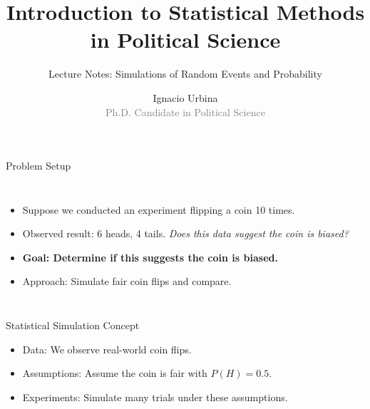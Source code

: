 \documentclass[]{beamer} %
\title{Introduction to Statistical Methods in Political Science}
\subtitle{Lecture Notes: Simulations of Random Events and Probability}
\author{Ignacio Urbina \texorpdfstring{\\ \vspace{0.3em}}{ } \scriptsize \textcolor{gray}{Ph.D. Candidate in Political Science}}
\date{}
\begin{document}
\begin{frame}
    \titlepage
\end{frame}

\begin{frame}{Problem Setup}
  \begin{columns}[T] %
      \begin{itemize}
        \item Suppose we conducted an experiment flipping a coin 10 times.
        \item Observed result: 6 heads, 4 tails. \emph{Does this data suggest the coin is biased?}
        \item \textbf{Goal: Determine if this suggests the coin is biased.}
        \item Approach: Simulate fair coin flips and compare.
      \end{itemize}
    \vspace{3.5em}
      \centering
  \end{columns}
\end{frame}


\begin{frame}{Statistical Simulation Concept}
    \begin{center}


    \end{center}
    \begin{itemize}
        \item Data: We observe real-world coin flips.
        \item Assumptions: Assume the coin is fair with $P(H) = 0.5$.
        \item Experiments: Simulate many trials under these assumptions.
    \end{itemize}
\end{frame}
\end{document}
